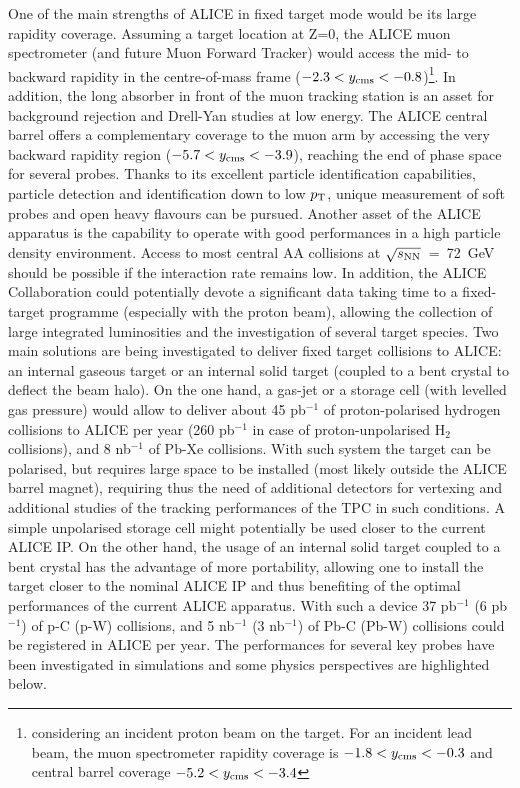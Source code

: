 \documentclass[../report.tex]{subfiles}
\begin{document}
 One of the main strengths of ALICE in fixed target mode would be its large rapidity coverage. Assuming a target location at Z=0, the ALICE muon spectrometer (and future Muon Forward Tracker) would access the mid- to backward rapidity in the centre-of-mass frame ($-2.3 < y_{\rm cms} < -0.8$)\footnote{\label{note1} considering an incident proton beam on the target. For an incident lead beam, the muon spectrometer rapidity coverage is $-1.8 < y_{\rm cms} < -0.3$ and central barrel coverage $-5.2 < y_{\rm cms} < -3.4$}. In addition, the long absorber in front of the muon tracking station is an asset for background rejection and Drell-Yan studies at low energy. The ALICE central barrel offers a complementary coverage to the muon arm by accessing the very backward rapidity region ($-5.7  < y_{\rm cms} < -3.9$), reaching the end of phase space for several probes. Thanks to its excellent particle identification capabilities, particle detection and identification down to low $p_{\rm T}$, unique measurement of soft probes and open heavy flavours can be pursued. Another asset of the ALICE apparatus is the capability to operate with good performances in a high particle density environment. Access to most central AA collisions at $\sqrt{s_{\rm NN}}$~=~72~GeV should be possible if the interaction rate remains low. In addition, the ALICE Collaboration could potentially devote a significant data taking time to a fixed-target programme (especially with the proton beam), allowing the collection of large integrated luminosities and the investigation of several target species. Two main solutions are being investigated to deliver fixed target collisions to ALICE: an internal gaseous target or an internal solid target (coupled to a bent crystal to deflect the beam halo). On the one hand, a gas-jet or a storage cell (with levelled gas pressure) would allow to deliver about 45 pb$^{-1}$ of proton-polarised hydrogen collisions to ALICE per year (260 pb$^{-1}$  in case of proton-unpolarised H$_{2}$ collisions), and 8 nb$^{-1}$ of Pb-Xe collisions. With such system the target can be polarised, but requires large space to be installed (most likely outside the ALICE barrel magnet), requiring thus the need of additional detectors for vertexing and additional studies of the tracking performances of the TPC in such conditions. A simple unpolarised storage cell might potentially be used closer to the current ALICE IP. On the other hand, the usage of an internal solid target coupled to a bent crystal has the advantage of more portability, allowing one to install the target closer to the nominal ALICE IP and thus benefiting of the optimal performances of the current ALICE apparatus. With such a device 37 pb$^{-1}$ (6 pb$^{-1}$) of p-C (p-W) collisions, and 5 nb$^{-1}$ (3 nb$^{-1}$) of Pb-C (Pb-W) collisions could be registered in ALICE per year. The performances for several key probes have been investigated in simulations and some physics perspectives are highlighted below. 
\end{document}

